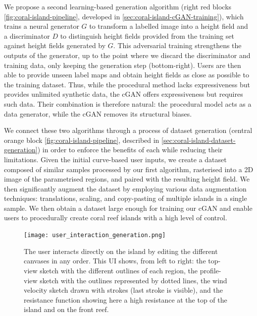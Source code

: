 We propose a second learning-based generation algorithm (right red blocks \cref{fig:coral-island-pipeline}, developed in \cref{sec:coral-island-cGAN-training}), which trains a neural generator $G$ to transform a labelled image into a height field and a discriminator $D$ to distinguish height fields provided from the training set against height fields generated by $G$. This adversarial training strengthens the outputs of the generator, up to the point where we discard the discriminator and training data, only keeping the generation step (bottom-right). Users are then able to provide unseen label maps and obtain height fields as close as possible to the training dataset. Thus, while the procedural method lacks expressiveness but provides unlimited synthetic data, the cGAN offers expressiveness but requires such data. Their combination is therefore natural: the procedural model acts as a data generator, while the cGAN removes its structural biases.

We connect these two algorithms through a process of dataset generation (central orange block \cref{fig:coral-island-pipeline}, described in \cref{sec:coral-island-dataset-generation}) in order to enforce the benefits of each while reducing their limitations. Given the initial curve-based user inputs, we create a dataset composed of similar samples processed by our first algorithm, rasterised into a 2D image of the parametrised regions, and paired with the resulting height field. We then significantly augment the dataset by employing various data augmentation techniques: translations, scaling, and copy-pasting of multiple islands in a single sample. We then obtain a dataset large enough for training our cGAN and enable users to procedurally create coral reef islands with a high level of control.

\begin{figure}
    \texttt{[image: user\_interaction\_generation.png]}
    \caption{The user interacts directly on the island by editing the different canvases in any order. This UI shows, from left to right: the top-view sketch with the different outlines of each region, the profile-view sketch with the outlines represented by dotted lines, the wind velocity sketch drawn with strokes (last stroke is visible), and the resistance function showing here a high resistance at the top of the island and on the front reef.}
    \label{fig:coral-island-wind-from-strokes-interaction}
\end{figure}


